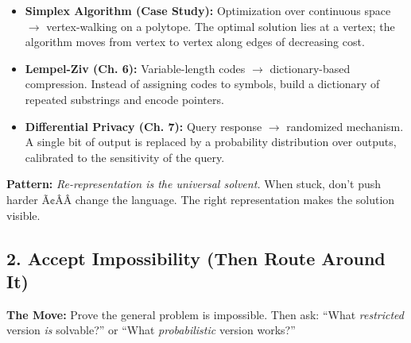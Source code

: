 \begin{itemize}
\item \textbf{Simplex Algorithm (Case Study):} Optimization over continuous space $\to$ vertex-walking on a polytope. The optimal solution lies at a vertex; the algorithm moves from vertex to vertex along edges of decreasing cost.

\item \textbf{Lempel-Ziv (Ch. 6):} Variable-length codes $\to$ dictionary-based compression. Instead of assigning codes to symbols, build a dictionary of repeated substrings and encode pointers.

\item \textbf{Differential Privacy (Ch. 7):} Query response $\to$ randomized mechanism. A single bit of output is replaced by a probability distribution over outputs, calibrated to the sensitivity of the query.
\end{itemize}

\begin{mentalLeap}\textbf{Pattern:} \emph{Re-representation is the universal solvent.} When stuck, don't push harder Ã¢ÂÂ change the language. The right representation makes the solution visible.\end{mentalLeap}
\subsection{2. Accept Impossibility (Then Route Around It)}
\label{sec:anatomy:impossible:route}

\textbf{The Move:} Prove the general problem is impossible. Then ask: ``What \emph{restricted} version \emph{is} solvable?'' or ``What \emph{probabilistic} version works?''

